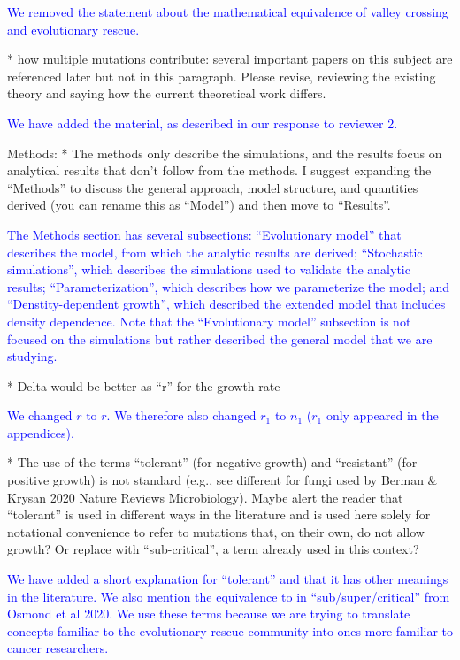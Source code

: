 \documentclass[12pt]{extarticle}
\renewcommand{\Delta}{r}
\begin{document}
\textcolor{blue}{We removed the statement about the mathematical equivalence of valley crossing and evolutionary rescue.}

* how multiple mutations contribute: several important papers on this subject are referenced later but not in this paragraph. Please revise, reviewing the existing theory and saying how the current theoretical work differs.

\textcolor{blue}{We have added the material, as described in our response to reviewer 2.}

Methods:
* The methods only describe the simulations, and the results focus on analytical results that don't follow from the methods. I suggest expanding the ``Methods'' to discuss the general approach, model structure, and quantities derived (you can rename this as ``Model'') and then move to ``Results''.

\textcolor{blue}{
The Methods section has several subsections: ``Evolutionary model'' that describes the model, from which the analytic results are derived; ``Stochastic simulations'', which describes the simulations used to validate the analytic results; ``Parameterization'', which describes how we parameterize the model; and ``Denstity-dependent growth'', which described the extended model that includes density dependence. Note that the ``Evolutionary model'' subsection is not focused on the simulations but rather described the general model that we are studying.} 

* Delta would be better as ``r'' for the growth rate

\textcolor{blue}{We changed $\Delta$ to $r$. We therefore also changed $r_1$ to $n_1$ ($r_1$ only appeared in the appendices).}

* The use of the terms ``tolerant'' (for negative growth) and ``resistant'' (for positive growth) is not standard (e.g., see different for fungi used by Berman $\&$ Krysan 2020 Nature Reviews Microbiology). Maybe alert the reader that ``tolerant'' is used in different ways in the literature and is used here solely for notational convenience to refer to mutations that, on their own, do not allow growth? Or replace with ``sub-critical'', a term already used in this context?

\textcolor{blue}{We have added a short explanation for ``tolerant'' and that it has other meanings in the literature. We also mention the equivalence to in ``sub/super/critical'' from Osmond et al 2020.
We use these terms because we are trying to translate concepts familiar to the evolutionary rescue community into ones more familiar to cancer researchers.} %
\end{document}
